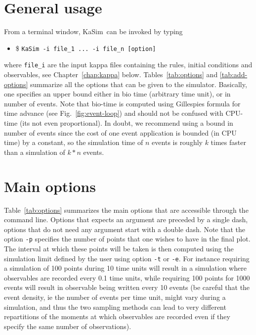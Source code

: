 \documentclass[11pt]{book}
\def\KaSim{\textsf{KaSim}}
\def\ttt#1{\texttt{#1}}
\def\ie{ie }
\def\ITE#1{\begin{itemize}#1\end{itemize}}
\begin{document}
\section{General usage}
From a terminal window, \KaSim~can be invoked by typing 
\ITE{
\item[\$] \ttt{KaSim -i file\_1 ... -i file\_n [option] }
}
where \ttt{file\_i} are the input kappa files containing the rules, initial conditions and observables, see Chapter~\ref{chap:kappa} below. Tables~\ref{tab:options} and \ref{tab:add-options} summarize all the options that can be given to the simulator. Basically, one specifies an upper bound either in bio time (arbitrary time unit), or in number of events. Note that bio-time is computed using Gillespie\textquotesingle s formula for time advance (see Fig.~\ref{fig:event-loop}) and should not be confused with CPU-time (it\textquotesingle s not even proportional). In doubt, we recommend using a bound in number of events since the cost of one event application is bounded (in CPU time) by a constant, so the simulation time of $n$ events is roughly $k$ times faster than a simulation of $k*n$ events.

\section{Main options}

Table~\ref{tab:options} summarizes the main options that are accessible through the command line. Options that expects an argument are preceded by a single dash, options that do not need any argument start with a double dash. Note that the option \ttt{-p} specifies the number of points that one wishes to have in the final plot. The interval at which these points will be taken is then computed using the simulation limit defined by the user using option \ttt{-t} or \ttt{-e}. For instance requiring a simulation of 100 points during 10 time units will result in a simulation where observables are recorded every 0.1 time units, while requiring 100 points for 1000 events will result in observable being written every 10 events (be careful that the event density, \ie the number of events per time unit, might vary during a simulation, and thus the two sampling methods can lead to very different repartitions of the moments at which observables are recorded even if they specify the same number of observations). 
\end{document}
